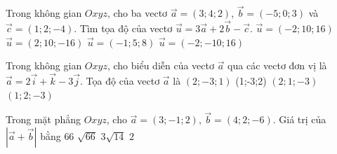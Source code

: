\begin{ex}%
	Trong không gian $Oxyz$,  cho ba vectơ $\overrightarrow{a}=(3;4;2)$, $\overrightarrow{b}=(-5;0;3)$ và $\overrightarrow{c}=(1;2;-4)$. Tìm tọa độ của vectơ $\overrightarrow{u} =3\overrightarrow{a}+2\overrightarrow{b}-\overrightarrow{c}$.
	\choice 
		{\True  $\overrightarrow{u}=(-2;10;16)$}
		 {$\overrightarrow{u}=(2;10;-16)$}
		 {$\overrightarrow{u}=(-1;5;8)$}
		{$\overrightarrow{u}=(-2;-10;16)$} 
\end{ex}

\begin{ex}%
	Trong không gian $Oxyz$, cho  biểu diễn của vectơ $\overrightarrow{a}$ qua các vectơ đơn vị là $\overrightarrow{a}=2\overrightarrow{i}+\overrightarrow{k}-3\overrightarrow{j}$. Tọa độ của vectơ $\overrightarrow{a}$ là
	\choice 
		{\True $(2;-3;1)$} 
		 {(1;-3;2)}
		 {$(2;1;-3)$}
		{$(1;2;-3)$} 
\end{ex}

\begin{ex}%
	Trong mặt  phẳng $Oxyz$, cho $\overrightarrow{a}=(3;-1;2)$, $\overrightarrow{b}=(4;2;-6)$. Giá trị của $\left|\overrightarrow{a}+\overrightarrow{b}\right|$ bằng
	 \choice
		 {$66$}
		{\True  $\sqrt{66}$}
		{$3 \sqrt{14}$} 
		{$2$} 
\end{ex}

